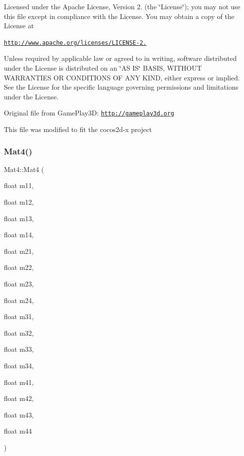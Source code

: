 Licensed under the Apache License, Version 2. (the \char`\"{}\+License\char`\"{}); you may not use this file except in compliance with the License. You may obtain a copy of the License at

\href{http://www.apache.org/licenses/LICENSE-2.0}{\tt http\+://www.\+apache.\+org/licenses/\+L\+I\+C\+E\+N\+S\+E-\/2.}

Unless required by applicable law or agreed to in writing, software distributed under the License is distributed on an \char`\"{}\+A\+S I\+S\char`\"{} B\+A\+S\+IS, W\+I\+T\+H\+O\+UT W\+A\+R\+R\+A\+N\+T\+I\+ES OR C\+O\+N\+D\+I\+T\+I\+O\+NS OF A\+NY K\+I\+ND, either express or implied. See the License for the specific language governing permissions and limitations under the License.

Original file from Game\+Play3D\+: \href{http://gameplay3d.org}{\tt http\+://gameplay3d.\+org}

This file was modified to fit the cocos2d-\/x project \mbox{\label{classMat4_a9ff0ba7e863527c97206e38a12b9738c}} 
\subsubsection{\texorpdfstring{Mat4()}{Mat4()}\hspace{0.1cm}{\footnotesize\ttfamily [2/8]}}
{\footnotesize\ttfamily Mat4\+::\+Mat4 (\begin{DoxyParamCaption}\item[{float}]{m11,  }\item[{float}]{m12,  }\item[{float}]{m13,  }\item[{float}]{m14,  }\item[{float}]{m21,  }\item[{float}]{m22,  }\item[{float}]{m23,  }\item[{float}]{m24,  }\item[{float}]{m31,  }\item[{float}]{m32,  }\item[{float}]{m33,  }\item[{float}]{m34,  }\item[{float}]{m41,  }\item[{float}]{m42,  }\item[{float}]{m43,  }\item[{float}]{m44 }\end{DoxyParamCaption})}


